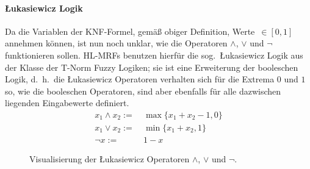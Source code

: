 \paragraph{Łukasiewicz Logik}
Da die Variablen der KNF-Formel, gemäß obiger Definition, Werte~$\in [0, 1]$ annehmen können, ist nun noch unklar, wie die Operatoren $\land$, $\lor$ und $\lnot$ funktionieren sollen.
HL-MRFs benutzen hierfür die sog.\ Łukasiewicz Logik aus der Klasse der T-Norm Fuzzy Logiken;
sie ist eine Erweiterung der booleschen Logik, d.~h.\ die Łukasiewicz Operatoren verhalten sich für die Extrema $0$ und $1$ so, wie die booleschen Operatoren, sind aber ebenfalls für alle dazwischen liegenden Eingabewerte definiert.
\begin{align}
	x_1 \land x_2 :=&\ \max\{ x_1 + x_2 - 1, 0 \} \\ %
	x_1 \lor x_2 :=&\ \min\{ x_1 + x_2, 1 \} \\ %
	\lnot x :=&\ 1 - x
\end{align}
\begin{figure}[h]
	\centering
	\caption{Visualisierung der Łukasiewicz Operatoren $\land$, $\lor$ und $\lnot$.}\label{fig:theory:luklogic}
\end{figure}

